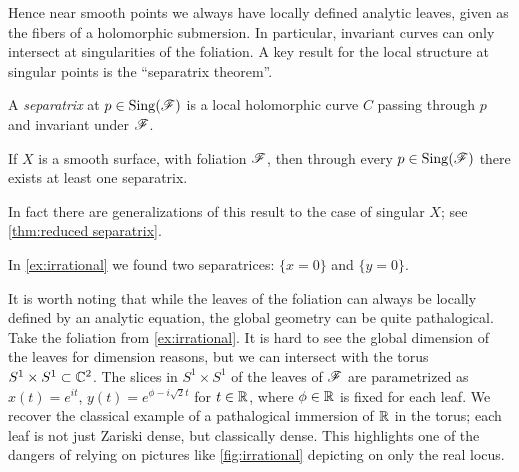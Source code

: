 Hence near smooth points we always have locally defined analytic leaves, given
as the fibers of a holomorphic submersion. In particular, invariant curves can
only intersect at singularities of the foliation. A key result for the local
structure at singular points is the ``separatrix theorem''.

\begin{definition}
    A \emph{separatrix} at $p\in\operatorname{Sing}(\mathscr{F})$ is a local holomorphic curve $C$
    passing through $p$ and invariant under $\mathscr{F}$.
\end{definition}

\begin{theorem}\label{thm:separatrix}
    If $X$ is a smooth surface, with foliation $\mathscr{F}$, then through every
    $p\in\operatorname{Sing}(\mathscr{F})$ there exists at least one separatrix.
\end{theorem}

In fact there are generalizations of this result to the case of singular $X$;
see \cref{thm:reduced separatrix}.

\begin{example}
    In \cref{ex:irrational} we found two separatrices: $\{x=0\}$ and
    $\{y=0\}$.
\end{example}

It is worth noting that while the leaves of the foliation can always be locally
defined by an analytic equation, the global geometry can be quite pathalogical.
Take the foliation from \cref{ex:irrational}. It is hard to see the global
dimension of the leaves for dimension reasons, but we can intersect with the
torus $S^1\times S^1\subset\mathbb{C}^2$. The slices in $S^1\times S^1$ of the leaves of
$\mathscr{F}$ are parametrized as $x(t)=e^{it}$, $y(t)=e^{\phi-i\sqrt2t}$ for
$t\in\mathbb{R}$, where $\phi\in\mathbb{R}$ is fixed for each leaf. We recover the classical
example of a pathalogical immersion of $\mathbb{R}$ in the torus; each leaf is not just
Zariski dense, but classically dense. This highlights one of the dangers of
relying on pictures like \cref{fig:irrational} depicting on only the real locus.

